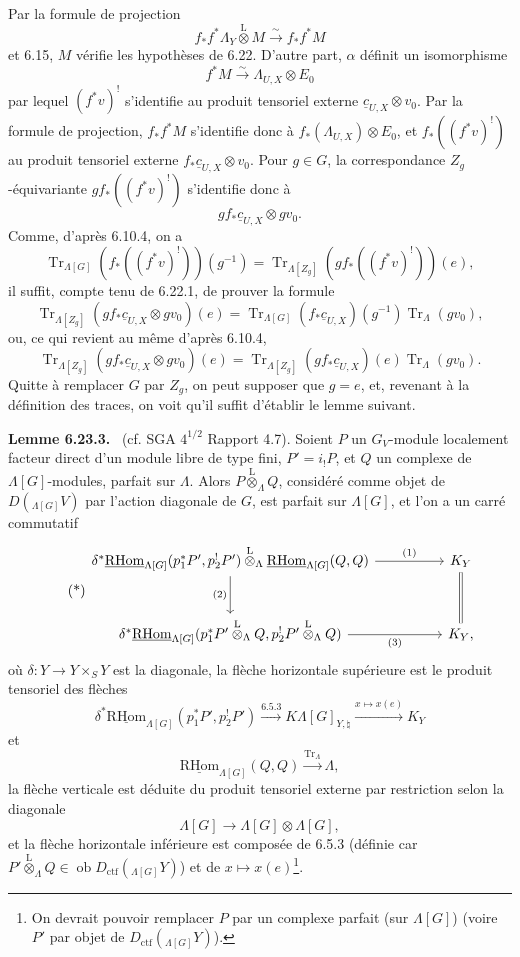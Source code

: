 \documentclass[11pt]{article}
\newenvironment{statement}[1]{\par\medskip\noindent\textbf{#1.}\ }{\par\medskip}
\newcommand{\ob}{\operatorname{ob}}
\providecommand{\RHom}{\mathrm{RHom}}
\providecommand{\uRHom}{\underline{\RHom}}
\providecommand{\Tr}{\operatorname{Tr}}
\providecommand{\Tr}{\operatorname{Tr}}
\providecommand{\lten}{\overset{\mathrm L}{\otimes}}
\providecommand{\Tr}{\operatorname{Tr}}
\providecommand{\RHom}{\mathrm{RHom}}
\providecommand{\ob}{\operatorname{ob}}
\providecommand{\lten}{\overset{\mathrm L}{\otimes}}
\providecommand{\RHom}{\mathrm R\mathcal{H}om}
\providecommand{\lten}{\overset{\mathrm L}{\otimes}}
\providecommand{\Tr}{\operatorname{Tr}}
\providecommand{\lten}{\overset{\mathrm L}{\otimes}}
\providecommand{\lten}{\overset{\mathrm L}{\otimes}}
\providecommand{\lten}{\overset{\mathrm L}{\otimes}}
\providecommand{\RHom}{\mathrm{RHom}}
\providecommand{\Tr}{\operatorname{Tr}}
\providecommand{\lten}{\overset{\mathrm L}{\otimes}}
\begin{document}
Par la formule de projection
\[
f_*f^*\Lambda_Y\lten M\xrightarrow{\sim}f_*f^*M
\]
et 6.15, $M$ vérifie les hypothèses de 6.22. D'autre part, $\alpha$ définit un isomorphisme
\[
f^*M\xrightarrow{\sim}\Lambda_{U,X}\otimes E_0
\]
par lequel $(f^*v)^!$ s'identifie au produit tensoriel externe $\underline c_{U,X}\otimes v_0$. Par la formule de projection, $f_*f^*M$ s'identifie donc à $f_*(\Lambda_{U,X})\otimes E_0$, et $f_*((f^*v)^!)$ au produit tensoriel externe $f_*\underline c_{U,X}\otimes v_0$. Pour $g\in G$, la correspondance $Z_g$-équivariante $gf_*((f^*v)^!)$ s'identifie donc à
\[
gf_*\underline c_{U,X}\otimes gv_0.
\]
Comme, d'après 6.10.4, on a
\[
\Tr_{\Lambda[G]}(f_*((f^*v)^!))(g^{-1})
=
\Tr_{\Lambda[Z_g]}(gf_*((f^*v)^!))(e),
\]
il suffit, compte tenu de 6.22.1, de prouver la formule
\[
\Tr_{\Lambda[Z_g]}(gf_*\underline c_{U,X}\otimes gv_0)(e)
=
\Tr_{\Lambda[G]}(f_*\underline c_{U,X})(g^{-1})\Tr_{\Lambda}(gv_0),
\]
ou, ce qui revient au même d'après 6.10.4,
\begin{equation}
\Tr_{\Lambda[Z_g]}(gf_*\underline c_{U,X}\otimes gv_0)(e)
=
\Tr_{\Lambda[Z_g]}(gf_*\underline c_{U,X})(e)\Tr_{\Lambda}(gv_0).
\tag{6.23.2}
\end{equation}
Quitte à remplacer $G$ par $Z_g$, on peut supposer que $g=e$, et, revenant à la définition des traces, on voit qu'il suffit d'établir le lemme suivant.

\begin{statement}{Lemme 6.23.3}
(cf. SGA $4^{1/2}$ Rapport 4.7). Soient $P$ un $G_V$-module localement facteur direct d'un module libre de type fini, $P'=i_!P$, et $Q$ un complexe de $\Lambda[G]$-modules, parfait sur $\Lambda$. Alors $P\lten_{\Lambda}Q$, considéré comme objet de $D({}_{\Lambda[G]}V)$ par l'action diagonale de $G$, est parfait sur $\Lambda[G]$, et l'on a un carré commutatif
\begin{equation}
\tag{*}
\begin{tikzcd}[column sep=huge,row sep=large]
\delta^*\uRHom_{\Lambda[G]}(p_1^*P',p_2^!P')\lten_{\Lambda}
\uRHom_{\Lambda[G]}(Q,Q) \arrow[r,"(1)"] \arrow[d,"(2)"']
& K_Y \arrow[d,equal]\\
\delta^*\uRHom_{\Lambda[G]}(p_1^*P'\lten_{\Lambda}Q,p_2^!P'\lten_{\Lambda}Q) \arrow[r,"(3)"']
& K_Y ,
\end{tikzcd}
\end{equation}
où $\delta:Y\to Y\times_SY$ est la diagonale, la flèche horizontale supérieure est le produit tensoriel des flèches
\[
\delta^*\uRHom_{\Lambda[G]}(p_1^*P',p_2^!P')\xrightarrow{6.5.3}
K\Lambda[G]_{Y,\natural}\xrightarrow{x\mapsto x(e)}K_Y
\]
et
\[
\uRHom_{\Lambda[G]}(Q,Q)\xrightarrow{\Tr_{\Lambda}}\Lambda,
\]
la flèche verticale est déduite du produit tensoriel externe par restriction selon la diagonale
\[
\Lambda[G]\to\Lambda[G]\otimes\Lambda[G],
\]
et la flèche horizontale inférieure est composée de 6.5.3 (définie car $P'\lten_{\Lambda}Q\in\ob D_{\mathrm{ctf}}({}_{\Lambda[G]}Y)$) et de $x\mapsto x(e)$\footnote{On devrait pouvoir remplacer $P$ par un complexe parfait (sur $\Lambda[G]$) (voire $P'$ par objet de $D_{\mathrm{ctf}}({}_{\Lambda[G]}Y)$).}.
\end{statement}
\end{document}
